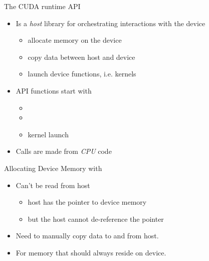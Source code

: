 \documentclass[aspectratio=43]{beamer}
\begin{document}
\begin{frame}[fragile]{The CUDA runtime API}

    \begin{itemize}
        \item Is a \emph{host} library for orchestrating interactions with the device
        \begin{itemize}
            \item allocate memory on the device
            \item copy data between host and device
            \item launch device functions, i.e. kernels
        \end{itemize}
        \item API functions start with 
        \begin{itemize}
            \item {}
            \item {}
            \item {} kernel launch
        \end{itemize}
        \item Calls are made from \emph{CPU} code
    \end{itemize}
\end{frame}


\begin{frame}[fragile]{Allocating Device Memory with }

    \begin{itemize}
        \item Can't be read from host
        \begin{itemize}
            \item host has the pointer to device memory
            \item but the host cannot de-reference the pointer 
        \end{itemize}
        \item Need to manually copy data to and from host.
        \item For memory that should always reside on device.
    \end{itemize}
\end{frame}
\end{document}
